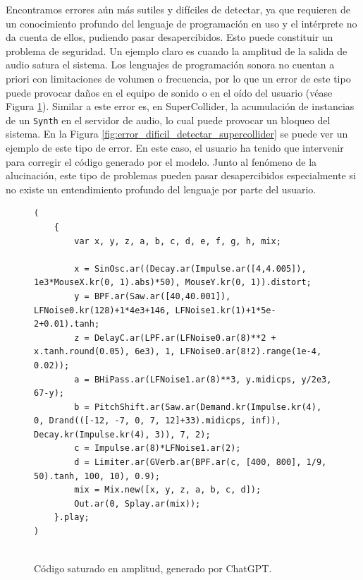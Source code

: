 Encontramos errores aún más sutiles y difíciles de detectar, ya que requieren de un conocimiento profundo del lenguaje de programación en uso y el intérprete no da cuenta de ellos, pudiendo pasar desapercibidos. Esto puede constituir un problema de seguridad. Un ejemplo claro es cuando la amplitud de la salida de audio satura el sistema. Los lenguajes de programación sonora no cuentan a priori con limitaciones de volumen o frecuencia, por lo que un error de este tipo puede provocar daños en el equipo de sonido o en el oído del usuario (véase Figura \ref{fig:amplitud_saturada_chatgpt}). Similar a este error es, en SuperCollider, la acumulación de instancias de un \texttt{Synth} en el servidor de audio, lo cual puede provocar un bloqueo del sistema. En la Figura \ref{fig:error_dificil_detectar_supercollider} se puede ver un ejemplo de este tipo de error. En este caso, el usuario ha tenido que intervenir para corregir el código generado por el modelo. Junto al fenómeno de la alucinación, este tipo de problemas pueden pasar desapercibidos especialmente si no existe un entendimiento profundo del lenguaje por parte del usuario.

\begin{figure}[H]
    \caption[Código saturado en amplitud, generado por ChatGPT]{Código saturado en amplitud, generado por ChatGPT.}
    \centering
    \begin{lstlisting}[style=SuperCollider-IDE, basicstyle=\footnotesize\ttfamily, numbers=none]
(
    {
        var x, y, z, a, b, c, d, e, f, g, h, mix;
        
        x = SinOsc.ar((Decay.ar(Impulse.ar([4,4.005]), 1e3*MouseX.kr(0, 1).abs)*50), MouseY.kr(0, 1)).distort;
        y = BPF.ar(Saw.ar([40,40.001]), LFNoise0.kr(128)+1*4e3+146, LFNoise1.kr(1)+1*5e-2+0.01).tanh;
        z = DelayC.ar(LPF.ar(LFNoise0.ar(8)**2 + x.tanh.round(0.05), 6e3), 1, LFNoise0.ar(8!2).range(1e-4, 0.02));
        a = BHiPass.ar(LFNoise1.ar(8)**3, y.midicps, y/2e3, 67-y);
        b = PitchShift.ar(Saw.ar(Demand.kr(Impulse.kr(4), 0, Drand(([-12, -7, 0, 7, 12]+33).midicps, inf)), Decay.kr(Impulse.kr(4), 3)), 7, 2);
        c = Impulse.ar(8)*LFNoise1.ar(2);
        d = Limiter.ar(GVerb.ar(BPF.ar(c, [400, 800], 1/9, 50).tanh, 100, 10), 0.9);
        mix = Mix.new([x, y, z, a, b, c, d]);
        Out.ar(0, Splay.ar(mix));
    }.play;
)
            
    \end{lstlisting}
    \source{\propio}
    \label{fig:amplitud_saturada_chatgpt}
\end{figure}


